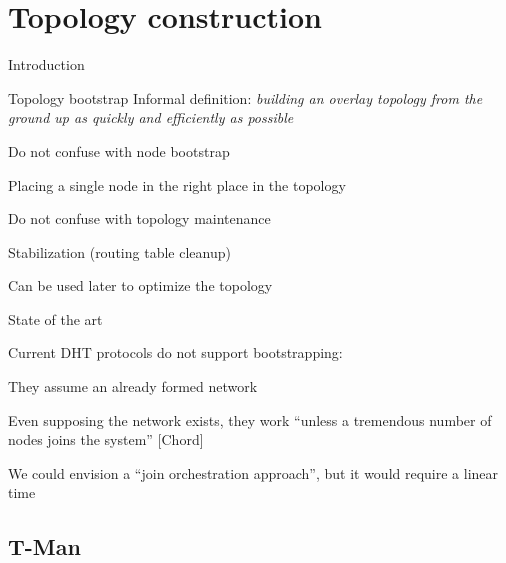 \section{Topology construction}

\begin{frame}{Introduction}

\begin{block}{Topology bootstrap}
Informal definition: \textit{building an overlay topology from the ground up as quickly and efficiently as possible}
\end{block}

\BIL
\item Do not confuse with node bootstrap
	\BI
	\item Placing a single node in the right place in the topology
	\EI
\item Do not confuse with topology maintenance
	\BI
	\item Stabilization (routing table cleanup)
	\item Can be used later to optimize the topology
	\EI
\EIL

\end{frame}

\begin{frame}{State of the art}
	
\BIL
\item \alert{Current DHT protocols do not support bootstrapping}:\\
\BIL
\item They assume an already formed network
\item Even supposing the network exists, they work “unless a tremendous number of nodes joins the system” [Chord]
\item We could envision a “join orchestration approach”, but it would require a linear time
\EI
\EI

\pause
\begin{Bib}
\end{Bib}

\end{frame}

\subsection{T-Man}

